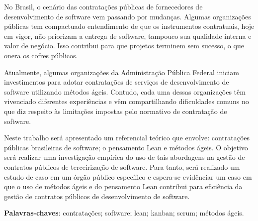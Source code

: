 \begin{resumo}
No Brasil, o cenário das contratações públicas de fornecedores de desenvolvimento de software vem passando por mudanças. Algumas organizações públicas tem compactuado entendimento de que os instrumentos contratuais, hoje em vigor, não priorizam a entrega de software, tampouco sua qualidade interna e valor de negócio. Isso contribui para que projetos terminem sem sucesso, o que onera os cofres públicos.

Atualmente, algumas organizações da Administração Pública Federal iniciam investimentos para adotar contratações de serviços de desenvolvimento de software utilizando métodos ágeis. Contudo, cada uma dessas organizações têm vivenciado diferentes experiências e vêm compartilhando dificuldades comuns no que diz respeito às limitações impostas pelo normativo de contratação de software.

Neste trabalho será apresentado um referencial teórico que envolve: contratações públicas brasileiras de software; o pensamento Lean e métodos ágeis. O objetivo será realizar uma investigação empírica do uso de tais abordagens na gestão de contratos públicos de terceirização de software. Para tanto, será realizado um estudo de caso em um órgão público específico e espera-se evidênciar um caso em que o uso de métodos ágeis e do pensamento Lean contribui para eficiência da gestão de contratos públicos de desenvolvimento de software.

\vspace{\onelineskip}
    
 \noindent
 \textbf{Palavras-chaves}: contratações; software; lean; kanban; scrum; métodos ágeis.
\end{resumo}
